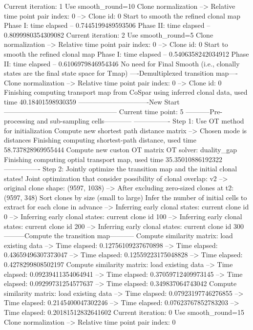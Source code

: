 \documentclass[letterpaper,10pt,english]{sphinxmanual}
\begin{document}
{\begin{sphinxVerbatim}[commandchars=\\\{\}]
Current iteration: 1
Use smooth\_round=10
Clone normalization
--> Relative time point pair index: 0
--> Clone id: 0
Start to smooth the refined clonal map
Phase I: time elapsed --  0.7445199489593506
Phase II: time elapsed --  0.8099980354309082
Current iteration: 2
Use smooth\_round=5
Clone normalization
--> Relative time point pair index: 0
--> Clone id: 0
Start to smooth the refined clonal map
Phase I: time elapsed --  0.5406358242034912
Phase II: time elapsed --  0.6106979846954346
No need for Final Smooth (i.e., clonally states are the final state space for Tmap)
----Demultiplexed transition map----
Clone normalization
--> Relative time point pair index: 0
--> Clone id: 0
Finishing computing transport map from CoSpar using inferred clonal data, used time 40.18401598930359
-------------------------------New Start--------------------------------------------------
Current time point: 5
-----------Pre-processing and sub-sampling cells------------
----------------
Step 1: Use OT method for initialization
Compute new shortest path distance matrix
--> Chosen mode is distances
Finishing computing shortest-path distance, used time 58.737828969955444
Compute new custon OT matrix
OT solver: duality\_gap
Finishing computing optial transport map, used time 35.35010886192322
----------------
Step 2: Jointly optimize the transition map and the initial clonal states!
Joint optimization that consider possibility of clonal overlap: v2
--> original clone shape: (9597, 1038)
--> After excluding zero-sized clones at t2: (9597, 348)
Sort clones by size (small to large)
Infer the number of initial cells to extract for each clone in advance
--> Inferring early clonal states: current clone id 0
--> Inferring early clonal states: current clone id 100
--> Inferring early clonal states: current clone id 200
--> Inferring early clonal states: current clone id 300
---------Compute the transition map-----------
Compute similarity matrix: load existing data
--> Time elapsed:  0.12756109237670898
--> Time elapsed:  0.43659496307373047
--> Time elapsed:  0.12559223175048828
--> Time elapsed:  0.4278299808502197
Compute similarity matrix: load existing data
--> Time elapsed:  0.09239411354064941
--> Time elapsed:  0.37059712409973145
--> Time elapsed:  0.09299731254577637
--> Time elapsed:  0.349837064743042
Compute similarity matrix: load existing data
--> Time elapsed:  0.07923197746276855
--> Time elapsed:  0.2145400047302246
--> Time elapsed:  0.07623767852783203
--> Time elapsed:  0.20181512832641602
Current iteration: 0
Use smooth\_round=15
Clone normalization
--> Relative time point pair index: 0

\end{sphinxVerbatim}}
\end{document}
